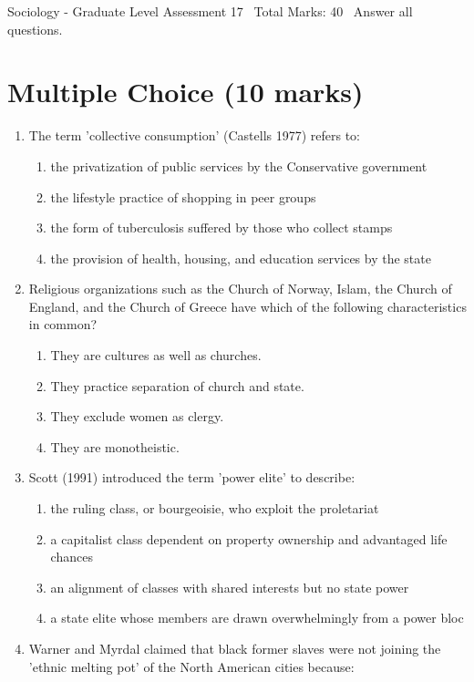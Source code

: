 \documentclass[12pt]{article}
\begin{document}
\begin{center}
Sociology - Graduate Level Assessment 17 \
Total Marks: 40 \
Answer all questions.
\end{center}

\section*{Multiple Choice (10 marks)}
\begin{enumerate}[label=\arabic*.]
\item The term 'collective consumption' (Castells 1977) refers to:
\begin{enumerate}[label=(\alph*)]
    \item the privatization of public services by the Conservative government
    \item the lifestyle practice of shopping in peer groups
    \item the form of tuberculosis suffered by those who collect stamps
    \item the provision of health, housing, and education services by the state
\end{enumerate}
\item Religious organizations such as the Church of Norway, Islam, the Church of England, and the Church of Greece have which of the following characteristics in common?
\begin{enumerate}[label=(\alph*)]
    \item They are cultures as well as churches.
    \item They practice separation of church and state.
    \item They exclude women as clergy.
    \item They are monotheistic.
\end{enumerate}
\item Scott (1991) introduced the term 'power elite' to describe:
\begin{enumerate}[label=(\alph*)]
    \item the ruling class, or bourgeoisie, who exploit the proletariat
    \item a capitalist class dependent on property ownership and advantaged life chances
    \item an alignment of classes with shared interests but no state power
    \item a state elite whose members are drawn overwhelmingly from a power bloc
\end{enumerate}
\item Warner and Myrdal claimed that black former slaves were not joining the 'ethnic melting pot' of the North American cities because:

\end{enumerate}
\end{document}
